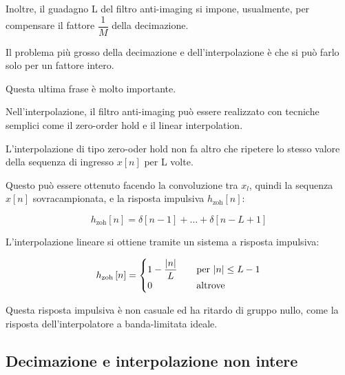 Inoltre, il guadagno L del filtro anti-imaging si impone, usualmente, per compensare il fattore $\dfrac{1}{M}$ della decimazione. \newline 

Il problema più grosso della decimazione e dell'interpolazione è che si può farlo solo per un fattore intero. \newline 

\begin{tcolorbox}
    Questa ultima frase è molto importante. 
\end{tcolorbox}

Nell'interpolazione, il filtro anti-imaging può essere realizzato con tecniche semplici come il zero-order hold e il linear interpolation. \newline 

L'interpolazione di tipo zero-oder hold non fa altro che ripetere lo stesso valore della sequenza di ingresso $x \left[ n\right]$ per L volte. \newline 

Questo può essere ottenuto facendo la convoluzione tra $x_{l}$, quindi la sequenza $x \left[ n\right]$ sovracampionata, e la risposta impulsiva $h_{\text{zoh}} \left[ n\right]$: 

{
    \Large 
    \begin{equation}
        h_{\text{zoh}} \left[ n\right] 
        = 
        \delta \left[ n - 1\right] 
        + 
        \dots 
        +
        \delta \left[ n - L + 1\right]  
    \end{equation}
}

L'interpolazione lineare si ottiene tramite un sistema a risposta impulsiva: 

{
    \Large 
    \begin{equation}
        h_{\text{zoh}} \left[ n\right] 
        = 
        \begin{cases}
            1 - \dfrac{\abs{n}}{L} \quad & \text{per } \abs{n} \leq L -1 
            \\
            0 \quad &\text{altrove}
        \end{cases}
    \end{equation}
}

Questa risposta impulsiva è non casuale ed ha ritardo di gruppo nullo, come la risposta dell'interpolatore a banda-limitata ideale. \newline 

\newpage 

\subsection{Decimazione e interpolazione non intere}

